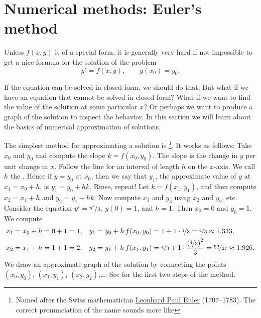 
\sectionnewpage
\section{Numerical methods: Euler's method}
\label{numer:section}


%


Unless $f(x,y)$ is of a special form,
it is generally very hard
if not impossible to get a nice formula for the solution of the problem
\begin{equation*}
y' = f(x,y), \qquad y(x_0) = y_0 .
\end{equation*}

If the equation can be solved in closed form, we should do that.
But what if we have an equation that cannot be solved in closed form?
What if we want to find the value of the solution at some particular $x$?
Or perhaps we want to produce a graph of the solution to inspect the
behavior.  In this section we will learn about the basics of numerical
approximation of solutions.

The simplest method for approximating a solution is
\emph{%
\footnote{Named after the Swiss mathematician
\href{https://en.wikipedia.org/wiki/Euler}{Leonhard Paul Euler}
(1707--1783).  The correct pronunciation of the name sounds more
like }}.  It works as follows:
Take $x_0$ and $y_0$ and compute the slope $k = f(x_0,y_0)$.  The slope is the
change in $y$ per unit change in $x$.  Follow the line for an interval of
length $h$ on the $x$-axis.
We call $h$ the \emph{}.
Hence if $y = y_0$ at $x_0$, then we say that
$y_1$, the approximate value of $y$ at $x_1 = x_0 + h$, is
$y_1 = y_0 + h k$.
Rinse, repeat!  Let $k = f(x_1,y_1)$, and then compute
$x_2 = x_1 + h$ and $y_2 = y_1 + h k$.
Now compute $x_3$ and $y_3$ using $x_2$ and $y_2$, etc.
Consider the equation $y' = \nicefrac{y^2}{3}$, $y(0)=1$, and $h=1$.
Then $x_0=0$ and $y_0 = 1$.  We compute
\begin{align*}
& x_1 = x_0 + h = 0 + 1 = 1, & & y_1 = y_0 + h \, f(x_0,y_0) = 1 + 1 \cdot
\nicefrac{1}{3} = \nicefrac{4}{3} \approx 1.333,\\
& x_2 = x_1 + h = 1 + 1 = 2, & & y_2 = y_1 + h \, f(x_1,y_1) =
\nicefrac{4}{3} + 1 \cdot \frac{{(\nicefrac{4}{3})}^2}{3} =
\nicefrac{52}{27} \approx 1.926.
\end{align*}
We draw an approximate graph of the solution by
connecting the points
$(x_0,y_0)$,
$(x_1,y_1)$,
$(x_2,y_2)$,\dots.
See 
for the first two steps of the method.

